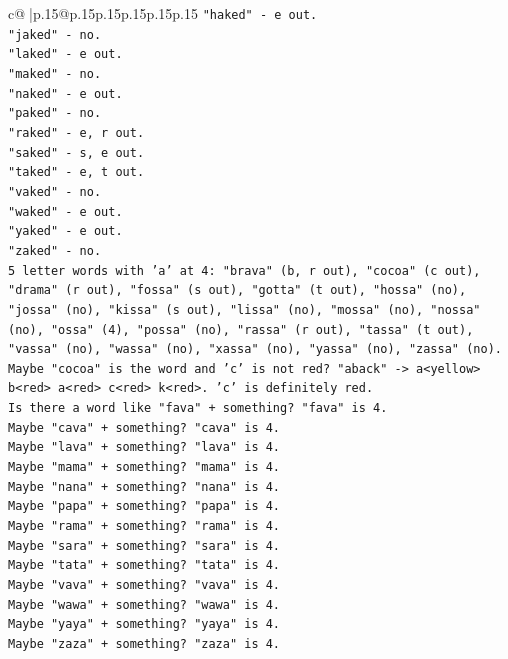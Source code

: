 \documentclass{article}
\begin{document}
{\begin{supertabular}{c@{$\;$}|p{.15\linewidth}@{}p{.15\linewidth}p{.15\linewidth}p{.15\linewidth}p{.15\linewidth}p{.15\linewidth}}
{{{\texttt{"haked" {-} e out.} \\
\texttt{"jaked" {-} no.} \\
\texttt{"laked" {-} e out.} \\
\texttt{"maked" {-} no.} \\
\texttt{"naked" {-} e out.} \\
\texttt{"paked" {-} no.} \\
\texttt{"raked" {-} e, r out.} \\
\texttt{"saked" {-} s, e out.} \\
\texttt{"taked" {-} e, t out.} \\
\texttt{"vaked" {-} no.} \\
\texttt{"waked" {-} e out.} \\
\texttt{"yaked" {-} e out.} \\
\texttt{"zaked" {-} no.} \\
\texttt{5 letter words with 'a' at 4: "brava" (b, r out), "cocoa" (c out), "drama" (r out), "fossa" (s out), "gotta" (t out), "hossa" (no), "jossa" (no), "kissa" (s out), "lissa" (no), "mossa" (no), "nossa" (no), "ossa" (4), "possa" (no), "rassa" (r out), "tassa" (t out), "vassa" (no), "wassa" (no), "xassa" (no), "yassa" (no), "zassa" (no).} \\
\texttt{Maybe "cocoa" is the word and 'c' is not red? "aback" {-}> a<yellow> b<red> a<red> c<red> k<red>. 'c' is definitely red.} \\
\texttt{Is there a word like "fava" + something? "fava" is 4.} \\
\texttt{Maybe "cava" + something? "cava" is 4.} \\
\texttt{Maybe "lava" + something? "lava" is 4.} \\
\texttt{Maybe "mama" + something? "mama" is 4.} \\
\texttt{Maybe "nana" + something? "nana" is 4.} \\
\texttt{Maybe "papa" + something? "papa" is 4.} \\
\texttt{Maybe "rama" + something? "rama" is 4.} \\
\texttt{Maybe "sara" + something? "sara" is 4.} \\
\texttt{Maybe "tata" + something? "tata" is 4.} \\
\texttt{Maybe "vava" + something? "vava" is 4.} \\
\texttt{Maybe "wawa" + something? "wawa" is 4.} \\
\texttt{Maybe "yaya" + something? "yaya" is 4.} \\
\texttt{Maybe "zaza" + something? "zaza" is 4.} \\
}}}
\end{supertabular}}
\end{document}
